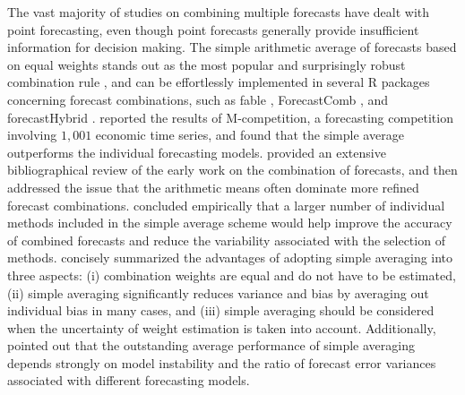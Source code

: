 \documentclass[11pt]{article}
\newcommand{\pkg}[1]{{\normalfont\fontseries{b}\selectfont #1}}
\let\proglang=\textsf
\begin{document}
The vast majority of studies on combining multiple forecasts have dealt with point forecasting, even though point forecasts generally provide insufficient information for decision making. The simple arithmetic average of forecasts based on equal weights stands out as the most popular and surprisingly robust combination rule \citep[see][]{Bunn1985-vo,Clemen1986-pd,Stock2003-sp,Genre2013-ut}, and can be effortlessly implemented in several \proglang{R} packages concerning forecast combinations, such as \pkg{fable} \citep{rfable}, \pkg{ForecastComb} \citep{rForecastComb}, and \pkg{forecastHybrid} \citep{rforecastHybrid}. \citet{Makridakis1982-hb} reported the results of M-competition, a forecasting competition involving $1,001$ economic time series, and found that the simple average outperforms the individual forecasting models. \citet{Clemen1989-fb} provided an extensive bibliographical review of the early work on the combination of forecasts, and then addressed the issue that the arithmetic means often dominate more refined forecast combinations. \citet{Makridakis1983-hg} concluded empirically that a larger number of individual methods included in the simple average scheme would help improve the accuracy of combined forecasts and reduce the variability associated with the selection of methods. \citet{Palm1992-im} concisely summarized the advantages of adopting simple averaging into three aspects: (i) combination weights are equal and do not have to be estimated, (ii) simple averaging significantly reduces variance and bias by averaging out individual bias in many cases, and (iii) simple averaging should be considered when the uncertainty of weight estimation is taken into account. Additionally, \citet{Timmermann2006-en} pointed out that the outstanding average performance of simple averaging depends strongly on model instability and the ratio of forecast error variances associated with different forecasting models.
\end{document}
